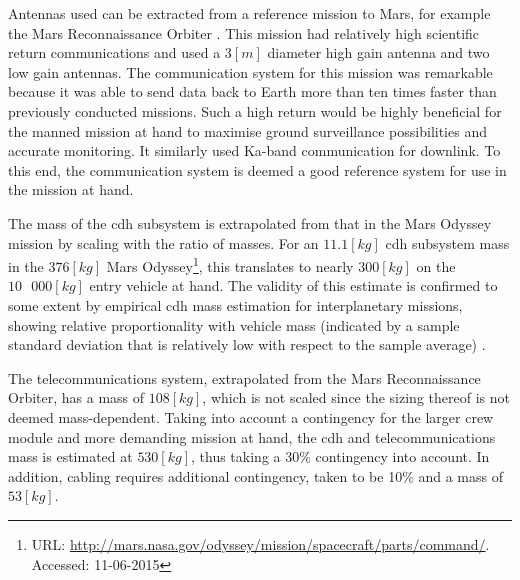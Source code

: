 Antennas used can be extracted from a reference mission to Mars, for example the Mars Reconnaissance Orbiter \cite{Taylor2006}. This mission had relatively high scientific return communications and used a $3 \left[m\right]$ diameter high gain antenna and two low gain antennas. The communication system for this mission was remarkable because it was able to send data back to Earth more than ten times faster than previously conducted missions. Such a high return would be highly beneficial for the manned mission at hand to maximise ground surveillance possibilities and accurate monitoring. It similarly used Ka-band communication for downlink. To this end, the communication system is deemed a good reference system for use in the mission at hand.

The mass of the \gls{cdh} subsystem is extrapolated from that in the Mars Odyssey mission by scaling with the ratio of masses. For an $11.1 \left[kg\right]$ \gls{cdh} subsystem mass in the $376 \left[kg\right]$ Mars Odyssey\footnote{URL: \url{http://mars.nasa.gov/odyssey/mission/spacecraft/parts/command/}. Accessed: 11-06-2015}, this translates to nearly $300 \left[kg\right]$ on the $10\mbox{ }000 \left[kg\right]$ entry vehicle at hand. The validity of this estimate is confirmed to some extent by empirical \gls{cdh} mass estimation for interplanetary missions, showing relative proportionality with vehicle mass (indicated by a sample standard deviation that is relatively low with respect to the sample average) \cite[p.953]{Wertz2011}.

The telecommunications system, extrapolated from the Mars Reconnaissance Orbiter, has a mass of $108\left[kg\right]$, which is not scaled since the sizing thereof is not deemed mass-dependent. Taking into account a contingency for the larger crew module and more demanding mission at hand, the \gls{cdh} and telecommunications mass is estimated at $530 \left[kg\right]$, thus taking a 30\% contingency into account. In addition, cabling requires additional contingency, taken to be 10\% and a mass of $53 \left[kg\right]$.